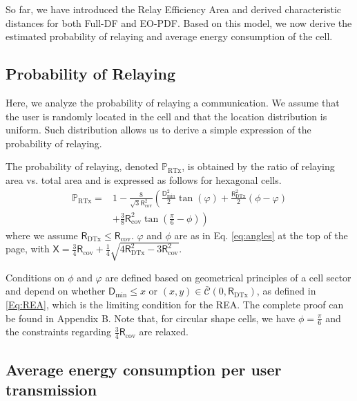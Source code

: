 \documentclass[journal]{IEEEtran}
\theoremstyle{definition}
\begin{document}
So far, we have introduced the Relay Efficiency Area and derived characteristic distances for both Full-DF and EO-PDF. Based on this model, we now derive the estimated probability of relaying and average energy consumption of the cell. 


\subsection{Probability of Relaying}

Here, we analyze the probability of relaying a communication. We assume that the user is randomly located in the cell and that the location distribution is uniform. Such distribution allows us to derive a simple expression of the probability of relaying.

The probability of relaying, denoted $\mathbb{P}_{\text{RTx}}$, is obtained by the ratio of relaying area vs. total area and is expressed as follows for hexagonal cells.
\begin{align}
\mathbb{P}_{\text{RTx}} = &
1- \frac{8}{\sqrt{3} \mathsf{R}_{\text{cov}}^2}
 \left(\frac{\mathsf{D}_{\min}^2}{2} \tan \left( \varphi \right) 
 +\frac{\mathsf{R}_{\text{DTx}}^2}{2} \left(\phi - \varphi \right) 
  \right. \nonumber
 \\ & \left.
 +\frac{3}{8} \mathsf{R}_{\text{cov}}^2 \tan \left( \frac{\pi}{6} - \phi \right)  \right)
\label{Eq:Prob_RTx}
\end{align}
where we assume $\mathsf{R}_{\text{DTx}} \leq \mathsf{R}_{\text{cov}}$. $\varphi$ and $\phi$ are as in Eq. \eqref{eq:angles} at the top of the page, with $\mathsf{X} = \frac{3}{4} \mathsf{R}_{\text{cov}} + \frac{1}{4} \sqrt{4\mathsf{R}_{\text{DTx}}^2 - 3 \mathsf{R}_{\text{cov}}^2}.$
\addtocounter{equation}{1}


Conditions on $\phi$ and $\varphi$ are defined based on geometrical principles of a cell sector and depend on whether $\mathsf{D}_{\min} \leq  x$ or $(x,y) \in \mathcal{\bar{C}}\left(0, \mathsf{R}_{\text{DTx}}\right)$, as defined in \eqref{Eq:REA}, which is the limiting condition for the REA. The complete proof can be found in Appendix B. Note that, for circular shape cells, we have $\phi = \frac{\pi}{6}$ and the constraints regarding $\frac{3}{4}\mathsf{R}_{\text{cov}}$ are relaxed.

 

\subsection{Average energy consumption per user transmission}
\end{document}
